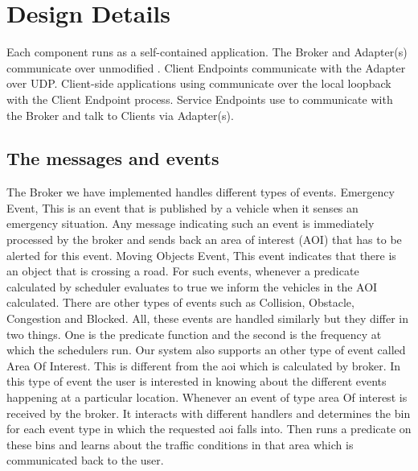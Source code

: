 \section{Design Details}
\label{sec:design-details}

Each \name{} component runs as a self-contained application. The
Broker and Adapter(s) communicate over unmodified \pubsub. Client
Endpoints communicate with the Adapter over UDP. Client-side
applications using \name{} communicate over the local loopback with
the Client Endpoint process. Service Endpoints use \pubsub{} to
communicate with the Broker and talk to Clients via
Adapter(s).

\subsection{The messages and events}

The \name{} Broker we have implemented handles different types of events. 
Emergency Event, This is an event that is published by a vehicle when it senses
an emergency situation. Any message indicating such an event is immediately 
processed by the \name{} broker and sends back an area of interest (AOI)
that has to be alerted for this event.
Moving Objects Event, This event indicates that there is an object that is 
crossing a road. For such events, whenever a predicate calculated by scheduler 
evaluates to true we inform the vehicles in the AOI calculated.
There are other types of events such as Collision, Obstacle, Congestion and 
Blocked. All, these events are handled similarly but they differ in two things.
One is the predicate function and the second is the frequency at which the 
schedulers run. Our system also supports an other type of event called 
Area Of Interest. This is different from the aoi which is calculated by
\name{} broker. In this type of event the user is interested in knowing about 
the different events happening at a particular location. Whenever an event of 
type area Of interest is received by the \name{} broker. It interacts with 
different handlers and determines the bin for each event type in which the 
requested aoi falls into. Then runs a predicate on these bins and learns about 
the traffic conditions in that area which is communicated back to the user.

